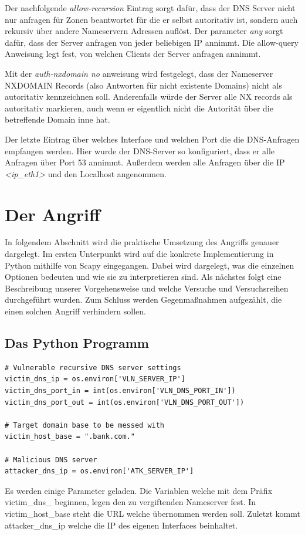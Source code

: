 \documentclass[10pt,a4paper]{article}
\begin{document}
Der nachfolgende \emph{allow-recursion} Eintrag sorgt dafür, dass der DNS Server nicht nur anfragen für Zonen beantwortet für die er selbst autoritativ ist, sondern auch rekursiv über andere Nameservern Adressen auflöst. Der parameter \emph{any} sorgt dafür, dass der Server anfragen von jeder beliebigen IP annimmt. Die allow-query Anweisung legt fest, von welchen Clients der Server anfragen annimmt.

Mit der \emph{auth-nxdomain no} anweisung wird festgelegt, dass der Nameserver NXDOMAIN Records (also Antworten für nicht existente Domains) nicht als autoritativ kennzeichnen soll. Anderenfalls würde der Server alle NX records als autoritativ  markieren, auch wenn er eigentlich nicht die Autorität über die betreffende Domain inne hat.

Der letzte Eintrag über welches Interface und welchen Port die die DNS-Anfragen empfangen werden. Hier wurde der DNS-Server so konfiguriert, dass er alle Anfragen über Port 53 annimmt. Außerdem werden alle Anfragen über die IP \emph{<ip\_eth1>} und den Localhost angenommen.

\section{Der Angriff}
In folgendem Abschnitt wird die praktische Umsetzung des Angriffs genauer dargelegt. Im ersten Unterpunkt wird auf die konkrete Implementierung in Python mithilfe von Scapy eingegangen. Dabei wird dargelegt, was die einzelnen Optionen bedeuten und wie sie zu interpretieren sind. Als nächstes folgt eine Beschreibung unserer Vorgehensweise und welche Versuche und Versuchsreihen durchgeführt wurden. Zum Schluss werden Gegenmaßnahmen aufgezählt, die einen solchen Angriff verhindern sollen.

\subsection{Das Python Programm}
\begin{center}
\begin{lstlisting}
# Vulnerable recursive DNS server settings
victim_dns_ip = os.environ['VLN_SERVER_IP']
victim_dns_port_in = int(os.environ['VLN_DNS_PORT_IN'])
victim_dns_port_out = int(os.environ['VLN_DNS_PORT_OUT'])

# Target domain base to be messed with
victim_host_base = ".bank.com."

# Malicious DNS server
attacker_dns_ip = os.environ['ATK_SERVER_IP']
\end{lstlisting}
\end{center}
Es werden einige Parameter geladen. Die Variablen welche mit dem Präfix victim\_dns\_ beginnen, legen den zu vergiftenden Nameserver fest. In victim\_host\_base steht die URL welche übernommen werden soll. Zuletzt kommt attacker\_dns\_ip welche die IP des eigenen Interfaces beinhaltet.
\end{document}
